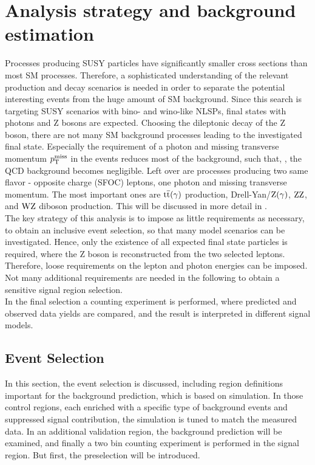 \chapter{Analysis strategy and background estimation}\label{chap:analysis}
\minitoc
Processes producing SUSY particles have significantly smaller cross sections than most SM processes. Therefore, a sophisticated understanding of the relevant production and decay scenarios is needed in order to separate the potential interesting events from the huge amount of SM background. Since this search is targeting SUSY scenarios with bino- and wino-like NLSPs, final states with photons and Z bosons are expected. Choosing the dileptonic decay of the Z boson, there are not many SM background processes leading to the investigated final state. Especially the requirement of a photon and missing transverse momentum $p_{\mathrm{T}}^\text{miss}$ in the events reduces most of the background, such that, \eg, the QCD background becomes negligible. Left over are processes producing two same flavor - opposite charge (SFOC) leptons, one photon and missing transverse momentum. The most important ones are ${\mathrm{t}\overline{\mathrm{t}}}(\gamma)$ production, Drell-Yan/$\mathrm{Z}(\gamma)$, $\mathrm{Z}\mathrm{Z}$, and $\mathrm{W}\mathrm{Z}$ diboson production. This will be discussed in more detail in .\\
The key strategy of this analysis is to impose as little requirements as necessary, to obtain an inclusive event selection, so that many model scenarios can be investigated. Hence, only the existence of all expected final state particles is required, where the Z boson is reconstructed from the two selected leptons. Therefore, loose requirements on the lepton and photon energies can be imposed. Not many additional requirements are needed in the following to obtain a sensitive signal region selection.\\
In the final selection a counting experiment is performed, where predicted and observed data yields are compared, and the result is interpreted in different signal models.

\section{Event Selection}
In this section, the event selection is discussed, including region definitions important for the background prediction, which is based on simulation. In those control regions, each enriched with a specific type of background events and suppressed signal contribution, the simulation is tuned to match the measured data. In an additional validation region, the background prediction will be examined, and finally a two bin counting experiment is performed in the signal region. But first, the preselection will be introduced.
